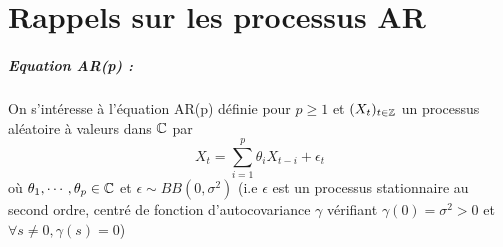 \documentclass{report}
\begin{document}


\printnomenclature
\chapter{Rappels sur les processus AR}\label{chap:AR}
\paragraph{Equation AR(p) :} 
On s'intéresse à l'équation AR(p) définie pour $p\geq 1$ et $(X_t)_{t\in \mathbb{Z}}$ un processus aléatoire à valeurs dans $\mathbb{C}$ par 
\begin{equation}\label{eq:AR}
X_t = \sum_{i=1}^p \theta_i X_{t-i} + \epsilon_t
\tag{AR}
\end{equation}
où $\theta_1,\cdots,\theta_p \in \mathbb{C}$ et $\epsilon \sim BB(0,\sigma^2)$ (i.e $\epsilon$ est un processus stationnaire au second ordre, centré de fonction d'autocovariance $\gamma$ vérifiant $\gamma(0)=\sigma^2 > 0$ et $\forall s\neq 0, \gamma(s)=0$)
\end{document}
